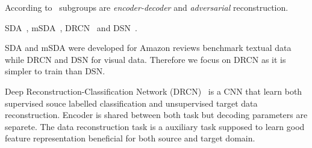 According to~\cite{wang2018} subgroups are \textit{encoder-decoder} and
\textit{adversarial} reconstruction.

SDA~\cite{vincent2008, glorot2011}, mSDA~\cite{chen2012}, DRCN~\cite{ghifary2016} and DSN~\cite{bousmalis2016}.

SDA and mSDA were developed for Amazon reviews benchmark textual data
while DRCN and DSN for visual data.
Therefore we focus on DRCN as it is simpler to train than DSN.

Deep Reconstruction-Classification Network (DRCN)~\cite{ghifary2016} is a CNN that learn both
supervised souce labelled classification
and unsupervised target data reconstruction.
Encoder is shared between both task but decoding parameters are separete.
The data reconstruction task is a auxiliary task
supposed to learn good feature representation beneficial for both source and target domain.
